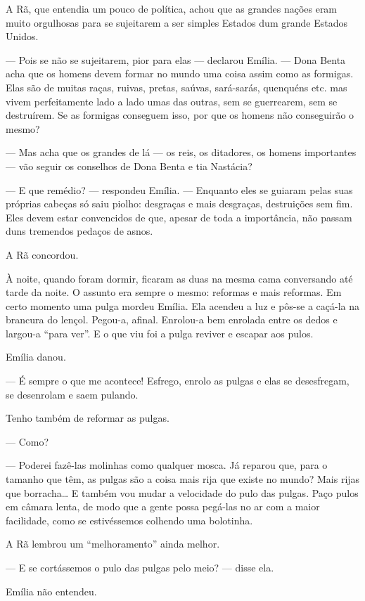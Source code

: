 A Rã, que entendia um pouco de política, achou que as grandes nações
eram muito orgulhosas para se sujeitarem a ser simples Estados dum
grande Estados Unidos.

--- Pois se não se sujeitarem, pior para elas --- declarou Emília. ---
Dona Benta acha que os homens devem formar no mundo uma coisa assim como
as formigas. Elas são de muitas raças, ruivas, pretas, saúvas,
sará-sarás, quenquéns etc. mas vivem perfeitamente lado a lado umas das
outras, sem se guerrearem, sem se destruírem. Se as formigas conseguem
isso, por que os homens não conseguirão o mesmo?

--- Mas acha que os grandes de lá --- os reis, os ditadores, os homens
importantes --- vão seguir os conselhos de Dona Benta e tia Nastácia?

--- E que remédio? --- respondeu Emília. --- Enquanto eles se guiaram
pelas suas próprias cabeças só saiu piolho: desgraças e mais desgraças,
destruições sem fim. Eles devem estar convencidos de que, apesar de toda
a importância, não passam duns tremendos pedaços de asnos.

A Rã concordou.

À noite, quando foram dormir, ficaram as duas na mesma cama conversando
até tarde da noite. O assunto era sempre o mesmo: reformas e mais
reformas. Em certo momento uma pulga mordeu Emília. Ela acendeu a luz e
pôs-se a caçá-la na brancura do lençol. Pegou-a, afinal. Enrolou-a bem
enrolada entre os dedos e largou-a ``para ver''. E o que viu foi a pulga
reviver e escapar aos pulos.

Emília danou.

--- É sempre o que me acontece! Esfrego, enrolo as pulgas e elas se
desesfregam, se desenrolam e saem pulando.

Tenho também de reformar as pulgas.

--- Como?

--- Poderei fazê-las molinhas como qualquer mosca. Já reparou que, para
o tamanho que têm, as pulgas são a coisa mais rija que existe no mundo?
Mais rijas que borracha\ldots{} E também vou mudar a velocidade do pulo
das pulgas. Paço pulos em câmara lenta, de modo que a gente possa
pegá-las no ar com a maior facilidade, como se estivéssemos colhendo uma
bolotinha.

A Rã lembrou um ``melhoramento'' ainda melhor.

--- E se cortássemos o pulo das pulgas pelo meio? --- disse ela.

Emília não entendeu.

